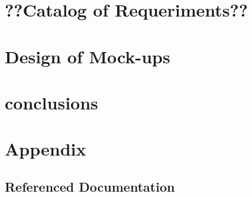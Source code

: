 \documentclass{sgnip}
\begin{document}
\chapter{??Catalog of Requeriments??}

\chapter{Design of Mock-ups}

\chapter{conclusions}

\chapter{Appendix}

\section{Referenced Documentation}
\end{document}
